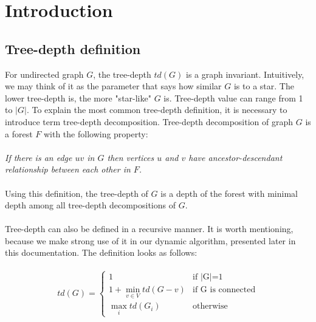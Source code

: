 \section{Introduction}
\subsection{Tree-depth definition}
For undirected graph $G$, the tree-depth $td(G)$ is a graph invariant. Intuitively, we may think of it as the parameter that says how similar $G$ is to a star. The lower tree-depth is, the more "star-like" $G$ is.
Tree-depth value can range from 1 to $|G|$.
To explain the most common tree-depth definition, it is necessary to introduce term tree-depth decomposition. Tree-depth decomposition of graph $G$ is a forest $F$ with the following property:\\\\
\emph{If there is an edge $uv$ in $G$ then vertices $u$ and $v$ have ancestor-descendant relationship between each other in $F$.}\\\\
Using this definition, the tree-depth of $G$ is a depth of the forest with minimal depth among all tree-depth decompositions of $G$.\\\\
Tree-depth can also be defined in a recursive manner. It is worth mentioning, because we make strong use of it in our dynamic algorithm, presented later in this documentation. The definition looks as follows:\\\\
\begin{equation}
td(G) =
\begin{cases}
1 & \text{if $|$G$|$=1}\\
1+\min_{v \in V} td(G-v) & \text{if G is connected}\\
\max_{i} td(G_{i})  & \text{otherwise}
\end{cases}\label{td_def}
\end{equation}
\\
